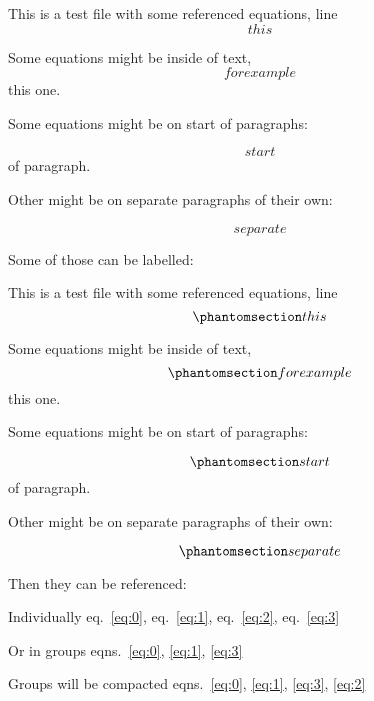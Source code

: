 This is a test file with some referenced equations, line
\begin{equation}{ this }\end{equation}

Some equations might be inside of text,
\begin{equation}{ for example }\end{equation} this one.

Some equations might be on start of paragraphs:

\begin{equation}{ start }\end{equation} of paragraph.

Other might be on separate paragraphs of their own:

\begin{equation}{ separate }\end{equation}

Some of those can be labelled:

This is a test file with some referenced equations, line
\begin{equation}\protect\phantomsection\label{eq:0}{ this }\end{equation}

Some equations might be inside of text,
\begin{equation}\protect\phantomsection\label{eq:1}{ for example }\end{equation}
this one.

Some equations might be on start of paragraphs:

\begin{equation}\protect\phantomsection\label{eq:2}{ start }\end{equation}
of paragraph.

Other might be on separate paragraphs of their own:

\begin{equation}\protect\phantomsection\label{eq:3}{ separate }\end{equation}

Then they can be referenced:

Individually eq.~\ref{eq:0}, eq.~\ref{eq:1}, eq.~\ref{eq:2},
eq.~\ref{eq:3}

Or in groups eqns.~\ref{eq:0}, \ref{eq:1}, \ref{eq:3}

Groups will be compacted
eqns.~\ref{eq:0}, \ref{eq:1}, \ref{eq:3}, \ref{eq:2}
